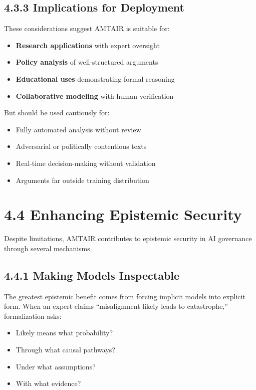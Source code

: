 \documentclass[
  11pt,
  letterpaper,
  openany]{book}
\providecommand{\tightlist}{%
  \setlength{\itemsep}{0pt}\setlength{\parskip}{0pt}}
\begin{document}
\subsection{4.3.3 Implications for
Deployment}\label{sec-deployment-implications}

These considerations suggest AMTAIR is suitable for:

\begin{itemize}
\tightlist
\item
  \textbf{Research applications} with expert oversight
\item
  \textbf{Policy analysis} of well-structured arguments
\item
  \textbf{Educational uses} demonstrating formal reasoning
\item
  \textbf{Collaborative modeling} with human verification
\end{itemize}

But should be used cautiously for:

\begin{itemize}
\tightlist
\item
  Fully automated analysis without review
\item
  Adversarial or politically contentious texts
\item
  Real-time decision-making without validation
\item
  Arguments far outside training distribution
\end{itemize}

\section{4.4 Enhancing Epistemic Security}\label{sec-epistemic-security}

Despite limitations, AMTAIR contributes to epistemic security in AI
governance through several mechanisms.

\subsection{4.4.1 Making Models
Inspectable}\label{sec-inspectable-models}

The greatest epistemic benefit comes from forcing implicit models into
explicit form. When an expert claims ``misalignment likely leads to
catastrophe,'' formalization asks:

\begin{itemize}
\tightlist
\item
  Likely means what probability?
\item
  Through what causal pathways?
\item
  Under what assumptions?
\item
  With what evidence?
\end{itemize}
\end{document}
